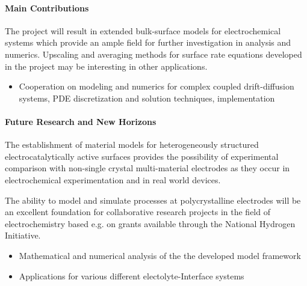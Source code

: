 \documentclass[a4paper,10pt]{article}
\begin{document}
\paragraph{Main Contributions}
The project will result in extended bulk-surface models for electrochemical systems which provide
an ample field for further investigation in analysis and numerics. Upscaling and averaging methods
for surface rate equations developed in the project may be interesting in other applications.

\begin{itemize}
\item Cooperation on modeling and numerics for complex coupled drift-diffusion systems, PDE
  discretization and solution techniques, implementation
\end{itemize}


\paragraph{Future Research and New Horizons}
The establishment of material models for heterogeneously structured electrocatalytically active surfaces
provides the possibility of experimental comparison with non-single crystal multi-material electrodes
as they occur in electrochemical experimentation and in real world devices.

The ability to model and simulate processes at polycrystalline electrodes will be an excellent foundation
for collaborative research projects in the field of electrochemistry based e.g. on grants available through
the National Hydrogen Initiative.

\begin{itemize}
\item Mathematical and numerical  analysis  of the the developed model framework
\item Applications for various different electolyte-Interface systems
\end{itemize}




\end{document}
